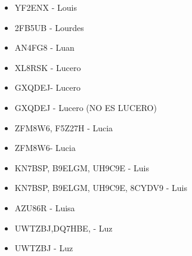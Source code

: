 \begin{itemize}[leftmargin=*,nosep]
\item YF2ENX - Louis
\item 2FB5UB - Lourdes
\item AN4FG8 - Luan
\item XL8RSK - Lucero
\item GXQDEJ- Lucero
\item GXQDEJ - Lucero (NO ES LUCERO)
\item ZFM8W6, F5Z27H - Lucia
\item ZFM8W6- Lucia
\item KN7BSP, B9ELGM, UH9C9E - Luis
\item KN7BSP, B9ELGM, UH9C9E, 8CYDV9 - Luis
\item AZU86R - Luisa
\item UWTZBJ,DQ7HBE, - Luz
\item UWTZBJ - Luz
\end{itemize}

